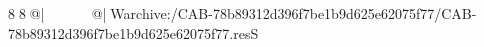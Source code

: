 8  8  @|                                                  @| W   archive:/CAB-78b89312d396f7be1b9d625e62075f77/CAB-78b89312d396f7be1b9d625e62075f77.resS 